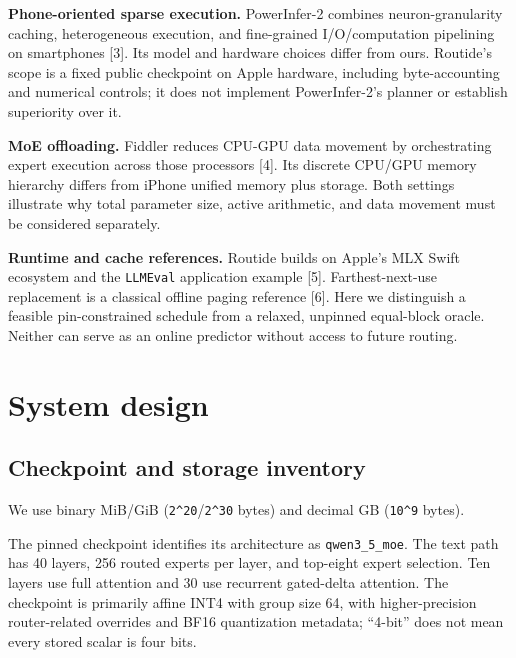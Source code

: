 \documentclass[11pt]{article}
\begin{document}
\textbf{Phone-oriented sparse execution.} PowerInfer-2 combines neuron-granularity
caching, heterogeneous execution, and fine-grained I/O/computation pipelining
on smartphones {[}3{]}. Its model and hardware choices differ from ours.
Routide's scope is a fixed public checkpoint on Apple hardware, including
byte-accounting and numerical controls; it does not implement PowerInfer-2's
planner or establish superiority over it.

\textbf{MoE offloading.} Fiddler reduces CPU-GPU data movement by orchestrating expert
execution across those processors {[}4{]}. Its discrete CPU/GPU memory hierarchy
differs from iPhone unified memory plus storage. Both settings illustrate why
total parameter size, active arithmetic, and data movement must be considered
separately.

\textbf{Runtime and cache references.} Routide builds on Apple's MLX Swift ecosystem
and the \texttt{LLMEval} application example {[}5{]}. Farthest-next-use replacement is a
classical offline paging reference {[}6{]}. Here we distinguish a feasible
pin-constrained schedule from a relaxed, unpinned equal-block oracle.
Neither can serve as an online predictor without access to future routing.

\hypertarget{system-design}{%
\section{System design}\label{system-design}}

\hypertarget{checkpoint-and-storage-inventory}{%
\subsection{Checkpoint and storage inventory}\label{checkpoint-and-storage-inventory}}

We use binary MiB/GiB (\texttt{2\^{}20}/\texttt{2\^{}30} bytes) and decimal GB (\texttt{10\^{}9} bytes).

The pinned checkpoint identifies its architecture as \texttt{qwen3\_5\_moe}. The text
path has 40 layers, 256 routed experts per layer, and top-eight expert selection.
Ten layers use full attention and 30 use recurrent gated-delta attention.
The checkpoint is primarily affine INT4 with group size 64, with higher-precision
router-related overrides and BF16 quantization metadata; ``4-bit'' does not
mean every stored scalar is four bits.
\end{document}
